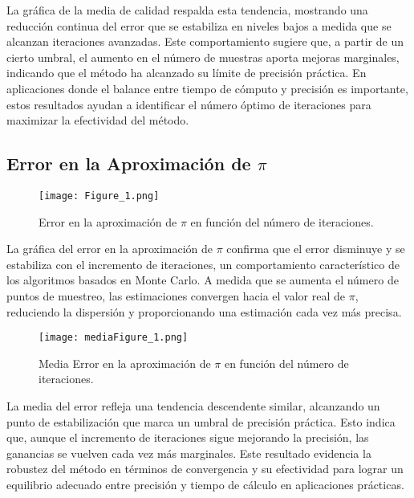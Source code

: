 \documentclass[conference, a4paper]{IEEEtran}
\begin{document}
La gráfica de la media de calidad respalda esta tendencia, mostrando una reducción continua del error que se estabiliza en niveles bajos a medida que se alcanzan iteraciones avanzadas. Este comportamiento sugiere que, a partir de un cierto umbral, el aumento en el número de muestras aporta mejoras marginales, indicando que el método ha alcanzado su límite de precisión práctica. En aplicaciones donde el balance entre tiempo de cómputo y precisión es importante, estos resultados ayudan a identificar el número óptimo de iteraciones para maximizar la efectividad del método.


\subsection{Error en la Aproximación de \(\pi\)}
\begin{figure}[H]
    \centering
    \texttt{[image: Figure\_1.png]}
    \caption{Error en la aproximación de \(\pi\) en función del número de iteraciones.}
    \label{fig:error}
\end{figure}

La gráfica del error en la aproximación de \(\pi\) confirma que el error disminuye y se estabiliza con el incremento de iteraciones, un comportamiento característico de los algoritmos basados en Monte Carlo. A medida que se aumenta el número de puntos de muestreo, las estimaciones convergen hacia el valor real de \(\pi\), reduciendo la dispersión y proporcionando una estimación cada vez más precisa.

\begin{figure}[H]
    \centering
    \texttt{[image: mediaFigure\_1.png]}
    \caption{Media Error en la aproximación de \(\pi\) en función del número de iteraciones.}
    \label{fig:error}
\end{figure}

La media del error refleja una tendencia descendente similar, alcanzando un punto de estabilización que marca un umbral de precisión práctica. Esto indica que, aunque el incremento de iteraciones sigue mejorando la precisión, las ganancias se vuelven cada vez más marginales. Este resultado evidencia la robustez del método en términos de convergencia y su efectividad para lograr un equilibrio adecuado entre precisión y tiempo de cálculo en aplicaciones prácticas.
\end{document}
